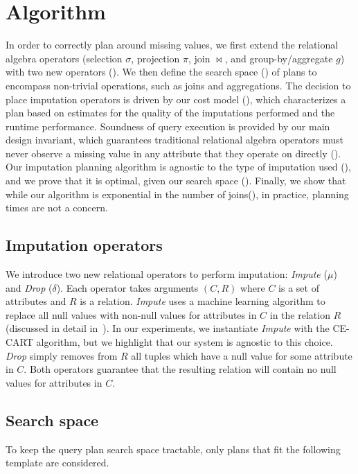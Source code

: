 \section{Algorithm}
In order to correctly plan around missing values, we first extend the relational algebra operators (selection $\sigma$, projection $\pi$, join $\bowtie$, and group-by/aggregate $g$) 
with two new operators (). We then define the search space () of plans to encompass non-trivial operations, such as joins and 
aggregations. The decision to place imputation operators is driven by our cost model (), which characterizes a plan based on estimates for the 
quality of the imputations performed and the runtime performance. Soundness of query execution is provided by our main design invariant, which guarantees traditional relational
algebra operators must never observe a missing value in any attribute that they operate on directly (). Our imputation planning algorithm is
agnostic to the type of imputation used (), and we prove that it is optimal, given our search space (). Finally, we show
that while our algorithm is exponential in the number of joins(), in practice, planning times are not a concern.

\subsection{Imputation operators}
\label{sec:operators}
We introduce two new relational operators to perform imputation: \textit{Impute} ($\mu$) and
\textit{Drop} ($\delta$). Each operator takes arguments $(C, R)$ where $C$ is a set of
attributes and $R$ is a relation. \textit{Impute} uses a machine learning algorithm to
replace all null values with non-null values for attributes in $C$ in the relation $R$ (discussed in detail in~).
In our experiments, we instantiate \textit{Impute} with the CE-CART\cite{burgette2010multiple} algorithm, but we highlight that
our system is agnostic to this choice.
\textit{Drop} simply removes from $R$ all tuples which have a null value for some attribute in $C$.
Both operators guarantee that the resulting relation will contain no null values for
attributes in $C$.  

\subsection{Search space}
\label{sec:search-space}
To keep the query plan search space tractable, only plans that fit the following template are considered.

